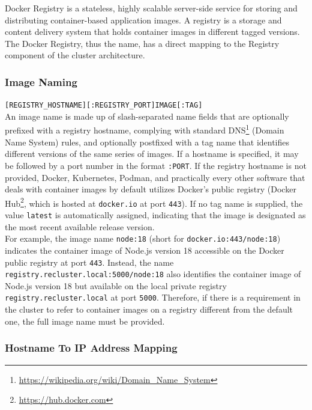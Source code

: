 Docker Registry is a stateless, highly scalable server-side service for storing and
distributing container-based application images\cite{docker_registry}. A registry
is a storage and content delivery system that holds container images in different
tagged versions\cite{docker_registry_about}. \\ %
The Docker Registry, thus the name, has a direct mapping to the Registry
component of the cluster architecture.

\subsubsection{Image Naming}
\label{subsubsec:implementation_dependencies_docker_registry_image_naming}

\texttt{[REGISTRY\_HOSTNAME][:REGISTRY\_PORT]IMAGE[:TAG]} \\ %
An image name is made up of slash-separated name fields that are optionally
prefixed with a registry hostname, complying with standard DNS\footnote{\url{https://wikipedia.org/wiki/Domain_Name_System}}
(Domain Name System) rules, and optionally postfixed with a tag name that
identifies different versions of the same series of images. If a hostname is specified,
it may be followed by a port number in the format \texttt{:PORT}. If the registry
hostname is not provided, Docker, Kubernetes, Podman, and practically every other
software that deals with container images by default utilizes Docker's public registry
(Docker Hub\footnote{\url{https://hub.docker.com}}, which is hosted at \texttt{docker.io}
at port \texttt{443})\cite{k8s_image_names}. If no tag name is supplied, the value
\texttt{latest} is automatically assigned, indicating that the image is designated
as the most recent available release version\cite{docker_tag}. \\ %
For example, the image name \texttt{node:18} (short for \texttt{docker.io:443/node:18})
indicates the container image of Node.js version 18 accessible on the Docker public
registry at port \texttt{443}. Instead, the name \texttt{registry.recluster.local:5000/node:18}
also identifies the container image of Node.js version 18 but available on the local
private registry \texttt{registry.recluster.local} at port \texttt{5000}.
Therefore, if there is a requirement in the cluster to refer to container images
on a registry different from the default one, the full image name must be
provided.

\subsubsection{Hostname To IP Address Mapping}
\label{subsubsec:implementation_dependencies_docker_registry_hostname_to_ip_address_mapping}

